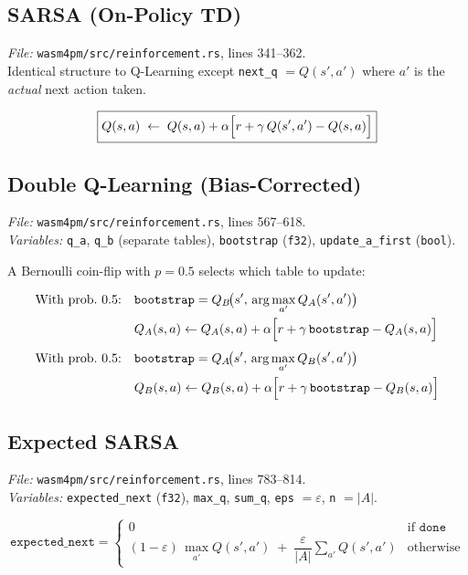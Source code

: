 \documentclass[11pt,a4paper]{article}
\begin{document}
\subsection{SARSA (On-Policy TD)}
\textit{File:} \texttt{wasm4pm/src/reinforcement.rs}, lines 341--362.\\
Identical structure to Q-Learning except \texttt{next\_q} $= Q(s',a')$ where $a'$ is the \emph{actual} next action taken.

\begin{equation}
  \boxed{Q(s,a) \;\leftarrow\; Q(s,a) + \alpha\Bigl[r + \gamma\,Q(s',a') - Q(s,a)\Bigr]}
\end{equation}

\subsection{Double Q-Learning (Bias-Corrected)}
\textit{File:} \texttt{wasm4pm/src/reinforcement.rs}, lines 567--618.\\
\textit{Variables:} \texttt{q\_a}, \texttt{q\_b} (separate tables), \texttt{bootstrap} (\texttt{f32}), \texttt{update\_a\_first} (\texttt{bool}).

A Bernoulli coin-flip with $p=0.5$ selects which table to update:

\begin{align}
  \text{With prob.\ 0.5:}\quad &
    \texttt{bootstrap} = Q_B\!\bigl(s',\,\arg\max_{a'} Q_A(s',a')\bigr) \notag\\
    &Q_A(s,a) \leftarrow Q_A(s,a) + \alpha\Bigl[r + \gamma\,\texttt{bootstrap} - Q_A(s,a)\Bigr] \\[4pt]
  \text{With prob.\ 0.5:}\quad &
    \texttt{bootstrap} = Q_A\!\bigl(s',\,\arg\max_{a'} Q_B(s',a')\bigr) \notag\\
    &Q_B(s,a) \leftarrow Q_B(s,a) + \alpha\Bigl[r + \gamma\,\texttt{bootstrap} - Q_B(s,a)\Bigr]
\end{align}

\subsection{Expected SARSA}
\textit{File:} \texttt{wasm4pm/src/reinforcement.rs}, lines 783--814.\\
\textit{Variables:} \texttt{expected\_next} (\texttt{f32}), \texttt{max\_q}, \texttt{sum\_q}, \texttt{eps} $=\varepsilon$, \texttt{n} $=|A|$.

\begin{equation}
  \texttt{expected\_next} =
  \begin{cases}
    0 & \text{if } \texttt{done} \\
    (1-\varepsilon)\,\max_{a'} Q(s',a') \;+\; \dfrac{\varepsilon}{|A|}\displaystyle\sum_{a'} Q(s',a')
    & \text{otherwise}
  \end{cases}
\end{equation}
\end{document}

